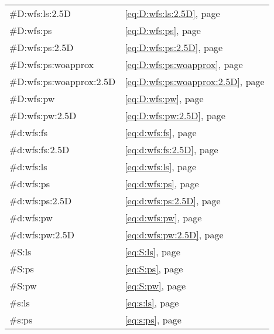 \begin{longtable}{ll}
    \#D:wfs:ls:2.5D           & \eqref{eq:D:wfs:ls:2.5D},             page \pageref{eq:D:wfs:ls:2.5D} \\
    \#D:wfs:ps                & \eqref{eq:D:wfs:ps},                  page \pageref{eq:D:wfs:ps} \\
    \#D:wfs:ps:2.5D           & \eqref{eq:D:wfs:ps:2.5D},             page \pageref{eq:D:wfs:ps:2.5D} \\
    \#D:wfs:ps:woapprox       & \eqref{eq:D:wfs:ps:woapprox},         page \pageref{eq:D:wfs:ps:woapprox} \\
    \#D:wfs:ps:woapprox:2.5D  & \eqref{eq:D:wfs:ps:woapprox:2.5D},    page \pageref{eq:D:wfs:ps:woapprox:2.5D} \\
    \#D:wfs:pw                & \eqref{eq:D:wfs:pw},                  page \pageref{eq:D:wfs:pw} \\
    \#D:wfs:pw:2.5D           & \eqref{eq:D:wfs:pw:2.5D},             page \pageref{eq:D:wfs:pw:2.5D} \\
    \#d:wfs:fs                & \eqref{eq:d:wfs:fs},                  page \pageref{eq:d:wfs:fs} \\
    \#d:wfs:fs:2.5D           & \eqref{eq:d:wfs:fs:2.5D},             page \pageref{eq:d:wfs:fs:2.5D} \\
    \#d:wfs:ls                & \eqref{eq:d:wfs:ls},                  page \pageref{eq:d:wfs:ls} \\
    \#d:wfs:ps                & \eqref{eq:d:wfs:ps},                  page \pageref{eq:d:wfs:ps} \\
    \#d:wfs:ps:2.5D           & \eqref{eq:d:wfs:ps:2.5D},             page \pageref{eq:d:wfs:ps:2.5D} \\
    \#d:wfs:pw                & \eqref{eq:d:wfs:pw},                  page \pageref{eq:d:wfs:pw} \\
    \#d:wfs:pw:2.5D           & \eqref{eq:d:wfs:pw:2.5D},             page \pageref{eq:d:wfs:pw:2.5D} \\
    \#S:ls                    & \eqref{eq:S:ls},                      page \pageref{eq:S:ls} \\
    \#S:ps                    & \eqref{eq:S:ps},                      page \pageref{eq:S:ps} \\
    \#S:pw                    & \eqref{eq:S:pw},                      page \pageref{eq:S:pw} \\
    \#s:ls                    & \eqref{eq:s:ls},                      page \pageref{eq:s:ls} \\
    \#s:ps                    & \eqref{eq:s:ps},                      page \pageref{eq:s:ps} \\

\end{longtable}
